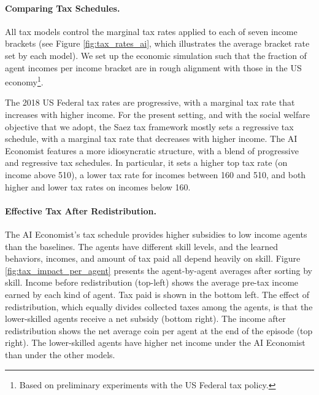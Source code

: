 \paragraph{Comparing Tax Schedules.}
All tax models control the marginal tax rates applied to each of seven income brackets (see Figure \ref{fig:tax_rates_ai}, which illustrates the average bracket rate set by each model).
We set up the economic simulation such that the fraction of agent incomes per income bracket are in rough alignment with those in the US economy\footnote{Based on preliminary experiments with the US Federal tax policy.}.

The 2018 US Federal tax rates are progressive, with a marginal tax rate  that increases with higher  income. For the present setting, and with the social welfare objective that we adopt, the Saez tax framework mostly sets a regressive tax schedule, with a marginal tax rate that decreases with higher income. The AI Economist features a more idiosyncratic structure, with a blend of progressive and regressive tax schedules. In particular, it sets a higher top tax rate (on income above 510), a lower tax rate for incomes between 160 and 510, and both higher and lower tax rates on incomes below 160.
\paragraph{Effective Tax After Redistribution.}
The AI Economist's tax schedule provides higher subsidies to low income agents than the baselines. %
The  agents have different skill levels, and the learned behaviors, incomes, and amount of tax paid all depend heavily on skill. Figure \ref{fig:tax_impact_per_agent} presents the agent-by-agent averages after sorting by skill. Income before redistribution (top-left) shows the average pre-tax income earned by each kind of agent. Tax paid is shown in the bottom left. The effect of redistribution,  which equally divides collected taxes among the agents, is that the lower-skilled agents receive a net subsidy (bottom right). The income after redistribution shows the net average coin per agent at the end of the episode (top right). The lower-skilled agents have higher net income under the AI Economist than under the other models.


